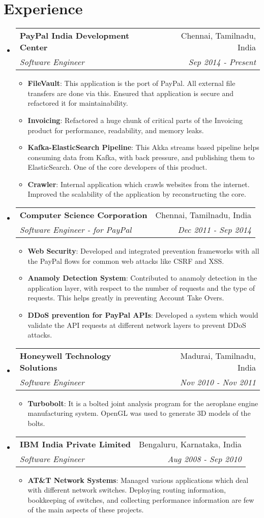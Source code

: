 \documentclass[letterpaper,11pt]{article}
\makeatletter
\newcommand{\resumeItem}[2]{
  \item\small{
    \textbf{#1}{: #2 \vspace{-2pt}}
  }
}
\newcommand{\resumeSubheading}[4]{
  \vspace{-1pt}\item
    \begin{tabular*}{0.97\textwidth}{l@{\extracolsep{\fill}}r}
      \textbf{#1} & #2 \\
      \textit{\small#3} & \textit{\small #4} \\
    \end{tabular*}\vspace{-5pt}
}
\newcommand{\resumeSubHeadingListStart}{\begin{itemize}[leftmargin=*]}
\newcommand{\resumeSubHeadingListEnd}{\end{itemize}}
\newcommand{\resumeItemListStart}{\begin{itemize}}
\newcommand{\resumeItemListEnd}{\end{itemize}\vspace{-5pt}}
\makeatother
\begin{document}
\section{Experience}
  \resumeSubHeadingListStart

    \resumeSubheading
      {PayPal India Development Center}{Chennai, Tamilnadu, India}
      {Software Engineer}{Sep 2014 - Present}
      \resumeItemListStart
        \resumeItem{FileVault}
          {This application is the port of PayPal. All external file transfers are done via this. Ensured that application is secure and refactored it for maintainability.}
        \resumeItem{Invoicing}
          {Refactored a huge chunk of critical parts of the Invoicing product for performance, readability, and memory leaks.}
        \resumeItem{Kafka-ElasticSearch Pipeline}
          {This Akka streams based pipeline helps consuming data from Kafka, with back pressure, and publishing them to ElasticSearch. One of the core developers of this product.}
        \resumeItem{Crawler}
          {Internal application which crawls websites from the internet. Improved the scalability of the application by reconstructing the core.}
      \resumeItemListEnd

    \resumeSubheading
      {Computer Science Corporation}{Chennai, Tamilnadu, India}
      {Software Engineer - for PayPal}{Dec 2011 - Sep 2014}
      \resumeItemListStart
        \resumeItem{Web Security}
          {Developed and integrated prevention frameworks with all the PayPal flows for common web attacks like CSRF and XSS.}
        \resumeItem{Anamoly Detection System}
          {Contributed to anamoly detection in the application layer, with respect to the number of requests and the type of requests. This helps greatly in preventing Account Take Overs.}
        \resumeItem{DDoS prevention for PayPal APIs}
          {Developed a system which would validate the API requests at different network layers to prevent DDoS attacks.}
      \resumeItemListEnd

    \resumeSubheading
      {Honeywell Technology Solutions}{Madurai, Tamilnadu, India}
      {Software Engineer}{Nov 2010 - Nov 2011}
      \resumeItemListStart
        \resumeItem{Turbobolt}
          {It is a bolted joint analysis program for the aeroplane engine manufacturing system. OpenGL was used to generate 3D models of the bolts.}
      \resumeItemListEnd

    \resumeSubheading
      {IBM India Private Limited}{Bengaluru, Karnataka, India}
      {Software Engineer}{Aug 2008 - Sep 2010}
      \resumeItemListStart
        \resumeItem{AT\&T Network Systems}
          {Managed various applications which deal with different network switches. Deploying routing information, bookkeeping of switches, and collecting performance information are few of the main aspects of these projects.}
      \resumeItemListEnd

  \resumeSubHeadingListEnd

\end{document}
